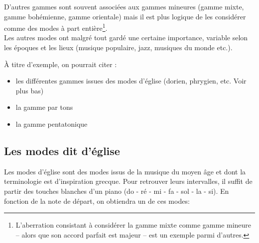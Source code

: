 \documentclass[11pt,a4paper]{scrreprt}
\begin{document}
\begin{center}
\end{center}

D'autres gammes sont souvent associées aux gammes mineures (gamme mixte, gamme bohémienne, gamme  orientale) mais il est plus logique de les considérer comme des modes à part entière\footnote{L'aberration consistant à considérer la gamme mixte comme gamme mineure -- alors que son accord parfait est majeur -- est un exemple parmi d'autres.}.\\

Les autres modes ont malgré tout gardé une certaine importance, variable selon les époques et les lieux (musique populaire, jazz, musiques du monde etc.).

À titre d'exemple, on pourrait citer :
\begin{itemize}
\item les différentes gammes issues des modes d'église (dorien, phrygien, etc. Voir plus bas)
\item la gamme par tons
\item la gamme pentatonique
\end{itemize}

\subsection{Les modes dit \og d'église \fg}
Les modes d'église sont des modes issus de la musique du moyen âge et dont la terminologie est d'inspiration grecque. Pour retrouver leurs intervalles, il suffit de partir des touches blanches d'un piano (do - ré - mi - fa - sol - la - si). En fonction de la note de départ, on obtiendra un de ces modes:
\end{document}

